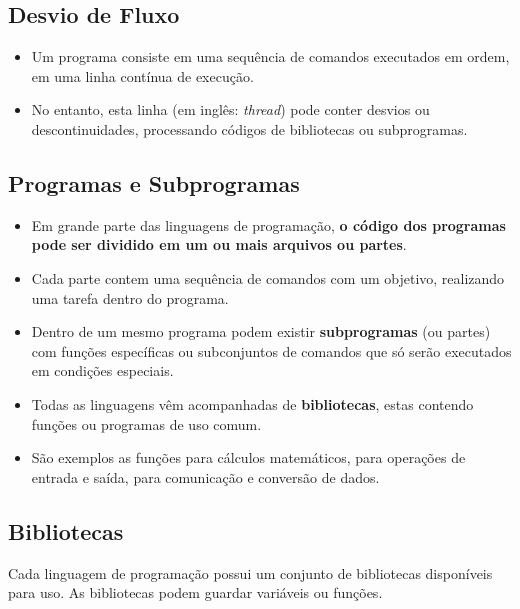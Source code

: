 \documentclass[12pt,a4paper]{article}
\begin{document}
    \hypertarget{desvio-de-fluxo}{%
\subsection{Desvio de Fluxo}\label{desvio-de-fluxo}}

    \begin{itemize}
\item
  Um programa consiste em uma sequência de comandos executados em ordem,
  em uma linha contínua de execução.
\item
  No entanto, esta linha (em inglês: \emph{thread}) pode conter desvios
  ou descontinuidades, processando códigos de bibliotecas ou
  subprogramas.
\end{itemize}

    \hypertarget{programas-e-subprogramas}{%
\subsection{Programas e Subprogramas}\label{programas-e-subprogramas}}

    \begin{itemize}
\item
  Em grande parte das linguagens de programação, \textbf{o código dos
  programas pode ser dividido em um ou mais arquivos ou partes}.
\item
  Cada parte contem uma sequência de comandos com um objetivo,
  realizando uma tarefa dentro do programa.
\item
  Dentro de um mesmo programa podem existir \textbf{subprogramas} (ou
  partes) com funções específicas ou subconjuntos de comandos que só
  serão executados em condições especiais.
\item
  Todas as linguagens vêm acompanhadas de \textbf{bibliotecas}, estas
  contendo funções ou programas de uso comum.
\item
  São exemplos as funções para cálculos matemáticos, para operações de
  entrada e saída, para comunicação e conversão de dados.
\end{itemize}

    \hypertarget{bibliotecas}{%
\subsection{Bibliotecas}\label{bibliotecas}}

    Cada linguagem de programação possui um conjunto de bibliotecas
disponíveis para uso. As bibliotecas podem guardar variáveis ou funções.
\end{document}
